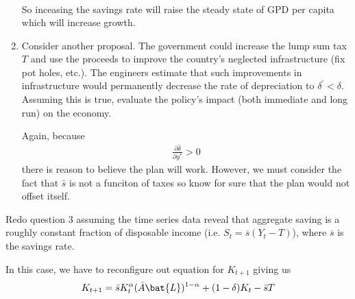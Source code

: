 \documentclass[11pt]{SelfArxOneColBMN}
\begin{document}
\begin{enumerate}[label=\alph*]
\begin{solution}
\begin{eqnarray*}
    \end{eqnarray*}
    So inceasing the savings rate will raise the steady state of GPD per capita which will increase growth. 
  \end{solution}
  \item Consider another proposal. The government could increase the lump sum tax $T$ and use the proceeds to improve the country's neglected infrastructure (fix pot holes, etc.). The engineers estimate that such improvements in infrastructure would permanently decrease the rate of depreciation to $\delta^\prime < \delta$. Assuming this is true, evaluate the policy's impact (both immediate and long run) on the economy. 
  \begin{solution}
    Again, because
    \begin{eqnarray*}
      \frac{\partial \bar{\delta}}{\partial y^*} > 0
    \end{eqnarray*}
    there is reason to believe the plan will work. However, we must consider the fact that $\bar{s}$ is not a funciton of taxes so know for sure that the plan would not offset itself. 
  \end{solution}
\end{enumerate}
Redo question 3 assuming the time series data reveal that aggregate saving is a roughly constant fraction of disposable income (i.e. $S_t = \overline{s}(Y_t - T)$), where $\overline{s}$ is the savings rate. 
\begin{solution}
  In this case, we have to reconfigure out equation for $K_{t+1}$ giving us
  \begin{eqnarray*}
    K_{t+1} = \bar{s}K_t^\alpha(\bar{A}\bat{L})^{1 - \alpha} + (1 - \delta)K_t - \bar{s}T
  \end{eqnarray*}
\end{solution}

\end{document}
